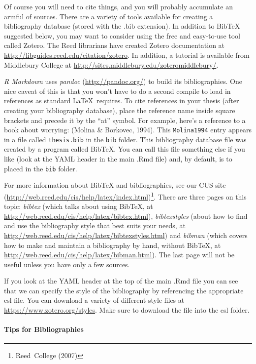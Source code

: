 \documentclass[12pt,twoside]{reedthesis}
\begin{document}
  Of course you will need to cite things, and you will probably accumulate
  an armful of sources. There are a variety of tools available for
  creating a bibliography database (stored with the .bib extension). In
  addition to BibTeX suggested below, you may want to consider using the
  free and easy-to-use tool called Zotero. The Reed librarians have
  created Zotero documentation at
  \url{http://libguides.reed.edu/citation/zotero}. In addition, a tutorial
  is available from Middlebury College at
  \url{http://sites.middlebury.edu/zoteromiddlebury/}.
  
  \emph{R Markdown} uses \emph{pandoc} (\url{http://pandoc.org/}) to build
  its bibliographies. One nice caveat of this is that you won't have to do
  a second compile to load in references as standard \LaTeX~requires. To
  cite references in your thesis (after creating your bibliography
  database), place the reference name inside square brackets and precede
  it by the ``at'' symbol. For example, here's a reference to a book about
  worrying: (Molina \& Borkovec, 1994). This \texttt{Molina1994} entry
  appears in a file called \texttt{thesis.bib} in the \texttt{bib} folder.
  This bibliography database file was created by a program called BibTeX.
  You can call this file something else if you like (look at the YAML
  header in the main .Rmd file) and, by default, is to placed in the
  \texttt{bib} folder.
  
  For more information about BibTeX and bibliographies, see our CUS site
  (\url{http://web.reed.edu/cis/help/latex/index.html})\footnote{Reed~College
    (2007)}. There are three pages on this topic: \emph{bibtex} (which
  talks about using BibTeX, at
  \url{http://web.reed.edu/cis/help/latex/bibtex.html}),
  \emph{bibtexstyles} (about how to find and use the bibliography style
  that best suits your needs, at
  \url{http://web.reed.edu/cis/help/latex/bibtexstyles.html}) and
  \emph{bibman} (which covers how to make and maintain a bibliography by
  hand, without BibTeX, at
  \url{http://web.reed.edu/cis/help/latex/bibman.html}). The last page
  will not be useful unless you have only a few sources.
  
  If you look at the YAML header at the top of the main .Rmd file you can
  see that we can specify the style of the bibliography by referencing the
  appropriate csl file. You can download a variety of different style
  files at \url{https://www.zotero.org/styles}. Make sure to download the
  file into the csl folder.
  
  \paragraph{Tips for Bibliographies}\label{tips-for-bibliographies}
  
\end{document}
